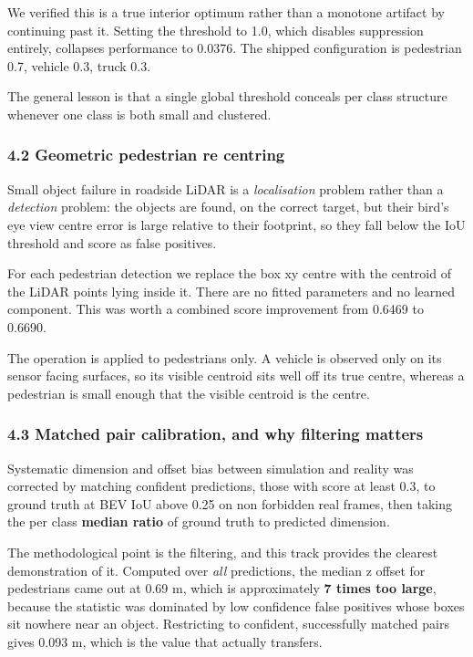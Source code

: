 \documentclass[
  10pt,
]{article}
\begin{document}
We verified this is a true interior optimum rather than a monotone
artifact by continuing past it. Setting the threshold to 1.0, which
disables suppression entirely, collapses performance to 0.0376. The
shipped configuration is pedestrian 0.7, vehicle 0.3, truck 0.3.

The general lesson is that a single global threshold conceals per class
structure whenever one class is both small and clustered.

\subsubsection{4.2 Geometric pedestrian re
centring}\label{geometric-pedestrian-re-centring}

Small object failure in roadside LiDAR is a \emph{localisation} problem
rather than a \emph{detection} problem: the objects are found, on the
correct target, but their bird's eye view centre error is large relative
to their footprint, so they fall below the IoU threshold and score as
false positives.

For each pedestrian detection we replace the box xy centre with the
centroid of the LiDAR points lying inside it. There are no fitted
parameters and no learned component. This was worth a combined score
improvement from 0.6469 to 0.6690.

The operation is applied to pedestrians only. A vehicle is observed only
on its sensor facing surfaces, so its visible centroid sits well off its
true centre, whereas a pedestrian is small enough that the visible
centroid is the centre.

\subsubsection{4.3 Matched pair calibration, and why filtering
matters}\label{matched-pair-calibration-and-why-filtering-matters}

Systematic dimension and offset bias between simulation and reality was
corrected by matching confident predictions, those with score at least
0.3, to ground truth at BEV IoU above 0.25 on non forbidden real frames,
then taking the per class \textbf{median ratio} of ground truth to
predicted dimension.

The methodological point is the filtering, and this track provides the
clearest demonstration of it. Computed over \emph{all} predictions, the
median z offset for pedestrians came out at 0.69 m, which is
approximately \textbf{7 times too large}, because the statistic was
dominated by low confidence false positives whose boxes sit nowhere near
an object. Restricting to confident, successfully matched pairs gives
0.093 m, which is the value that actually transfers.
\end{document}
